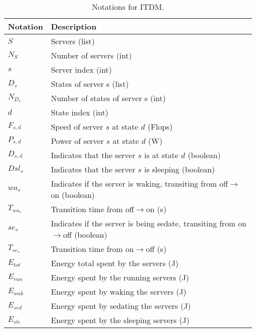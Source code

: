 \begin{table*}[!htb]
\centering
\caption{Notations for ITDM.}
\label{tab:notation_it}
\begin{tabular}{l|l}
    \hline
    Notation & Description \\\hline\hline
    $S$ & Servers (list) \\
    $N_{S}$ & Number of servers (int) \\
    $s$ & Server index (int) \\
    $D_s$ & States of server s (list) \\
    $N_{D_{s}}$ & Number of states of server s (int) \\
    $d$ & State index (int) \\
    $F_{s,d}$ & Speed of server $s$ at state $d$ (Flops)\\
    $P_{s,d}$ & Power of server $s$ at state $d$ (W)\\
    $D_{s,d}$ & Indicates that the server $s$ is at state $d$ (boolean)\\
    $Dsl_{s}$ & Indicates that the server $s$ is sleeping (boolean)\\
    $wa_s$ & Indicates if the server is waking, transiting from off$\rightarrow$on (boolean) \\
    $T_{wa_s}$ & Transition time from off$\rightarrow$on (s) \\
    $se_s$ & Indicates if the server is being sedate, transiting from on$\rightarrow$off (boolean) \\
    $T_{se_s}$ & Transition time from on$\rightarrow$off (s) \\    
    $E_{tot}$ & Energy total spent by the servers (J) \\
    $E_{run}$ & Energy spent by the running servers (J) \\
    $E_{wak}$ & Energy spent by waking the servers (J) \\
    $E_{sed}$ & Energy spent by sedating the servers (J) \\
    $E_{sle}$ & Energy spent by the sleeping servers (J) \\
    \hline
\end{tabular}
\end{table*}